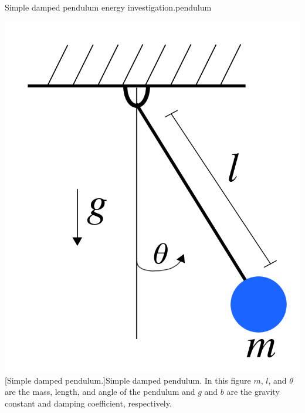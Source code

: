 \begin{example}{Simple damped pendulum energy investigation.}{pendulum}
  \begin{center}
    \captionsetup{type=figure}
    \includegraphics[width=0.3\linewidth]{figures/figure-pendulum.png}
    [Simple damped pendulum.]{Simple damped pendulum. In this figure $m$, $l$, and $\theta$ are the mass, length, and angle of the pendulum and $g$ and $b$ are the gravity constant and damping coefficient, respectively.} \label{fig:pendulum}
  \end{center}


\end{example}
